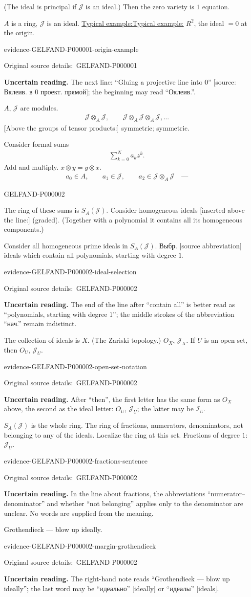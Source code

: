 \documentclass[11pt]{article}
\let\MathUnderline\underline
\renewcommand{\underline}[1]{\ifmmode\MathUnderline{#1}\else\uline{#1}\fi}
\newcommand{\SourcePage}[2]{\par\smallskip\phantomsection\label{#1:source-page}{\small\sffamily\color{blue!55!black}#1}\par\smallskip}
\newcommand{\EvidenceBlock}[4]{%
 \par\smallskip\noindent\begin{minipage}{\linewidth}
 \begin{minipage}[t]{.47\linewidth}\vspace{0pt}\centering
 \csname evidence-#1-#2\endcsname\par
 {\scriptsize\SourceCropCaption\ #1}\par
 \end{minipage}\hfill
 \begin{minipage}[t]{.49\linewidth}\vspace{0pt}\raggedright
 {\small\color{orange!65!black}\textbf{#4} #3}\par
 \end{minipage}
 \end{minipage}\par\smallskip}
\newcommand{\Unclear}[3]{\EvidenceBlock{#1}{#2}{#3}{\ReadingCaption}}
\newcommand{\SourceCropCaption}{Original source details:}\newcommand{\ReadingCaption}{Uncertain reading.}\newcommand{\IncompleteCaption}{Undeciphered passage.}\newcommand{\DiagramCaption}{Diagram and typed description.}
\begin{document}
(The ideal is principal if $\mathcal{J}$ is an ideal.)
Then the zero variety is $1$ equation.

$A$ is a ring, $\mathcal{J}$ is an ideal.
\underline{Typical example:} $R^2$, the ideal $=0$ at the origin.
\Unclear{GELFAND-P000001}{origin-example}{The next line: ``Gluing a projective line into $0$'' [source: Вклеив. в $0$ проект. прямой]; the beginning may read ``Оклеив.''.}

$A$, $\mathcal{J}$ are modules.
\begin{gather*}
 \mathcal{J}\otimes_A\mathcal{J},\qquad
 \mathcal{J}\otimes_A\mathcal{J}\otimes_A\mathcal{J},\ldots
\end{gather*}
[Above the groups of tensor products:] symmetric; symmetric.

Consider formal sums
\begin{gather*}
 \sum_{k=0}^{N}a_kz^k.
\end{gather*}
Add and multiply.
$x\otimes y=y\otimes x$.
\begin{gather*}
 a_0\in A,\qquad a_1\in\mathcal{J},\qquad
 a_2\in\mathcal{J}\otimes_A\mathcal{J}\quad\text{—}
\end{gather*}

\SourcePage{GELFAND-P000002}{unlabelled}
The ring of these sums is $S_A(\mathcal{J})$.
Consider homogeneous ideals
[inserted above the line:] (graded).
(Together with a polynomial it contains all its homogeneous components.)

Consider all homogeneous prime ideals in $S_A(\mathcal{J})$.
Выбр. [source abbreviation] ideals which contain all polynomials, starting with degree $1$.
\Unclear{GELFAND-P000002}{ideal-selection}{The end of the line after ``contain all'' is better read as ``polynomials, starting with degree $1$''; the middle strokes of the abbreviation ``нач.'' remain indistinct.}

The collection of ideals is $X$. (The Zariski topology.)
$O_X$, $\mathcal{J}_X$.
If $U$ is an open set, then $O_U$, $\mathcal{J}_U$.
\Unclear{GELFAND-P000002}{open-set-notation}{After ``then'', the first letter has the same form as $O_X$ above, the second as the ideal letter: $O_U$, $\mathcal{J}_U$; the latter may be $\mathcal{I}_U$.}

$S_A(\mathcal{J})$ is the whole ring.
The ring of fractions, numerators, denominators, not belonging to any of the ideals.
Localize the ring at this set.
Fractions of degree $1$: $\mathcal{J}_U$.
\Unclear{GELFAND-P000002}{fractions-sentence}{In the line about fractions, the abbreviations ``numerator--denominator'' and whether ``not belonging'' applies only to the denominator are unclear. No words are supplied from the meaning.}
[At right, two downward arrows:] Grothendieck --- blow up ideally.
\Unclear{GELFAND-P000002}{margin-grothendieck}{The right-hand note reads ``Grothendieck --- blow up ideally''; the last word may be ``идеально'' [ideally] or ``идеалы'' [ideals].}
\end{document}
